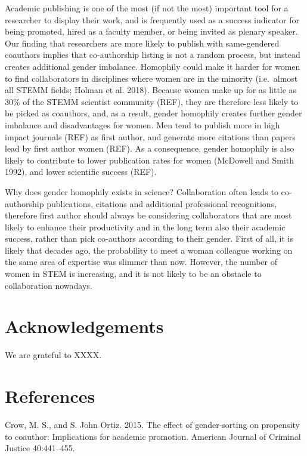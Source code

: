 \documentclass[12pt,]{article}
\begin{document}
Academic publishing is one of the most (if not the most) important tool
for a researcher to display their work, and is frequently used as a
success indicator for being promoted, hired as a faculty member, or
being invited as plenary speaker. Our finding that researchers are more
likely to publish with same-gendered coauthors implies that
co-authorship listing is not a random process, but instead creates
additional gender imbalance. Homophily could make it harder for women to
find collaborators in disciplines where women are in the minority
(i.e.~almost all STEMM fields; Holman et al. 2018). Because women make
up for as little as 30\% of the STEMM scientist community (REF), they
are therefore less likely to be picked as coauthors, and, as a result,
gender homophily creates further gender imbalance and disadvantages for
women. Men tend to publish more in high impact journals (REF) as first
author, and generate more citations than papers lead by first author
women (REF). As a consequence, gender homophily is also likely to
contribute to lower publication rates for women (McDowell and Smith
1992), and lower scientific success (REF).

Why does gender homophily exists in science? Collaboration often leads
to co-authorship publications, citations and additional professional
recognitions, therefore first author should always be considering
collaborators that are most likely to enhance their productivity and in
the long term also their academic success, rather than pick co-authors
according to their gender. First of all, it is likely that decades ago,
the probability to meet a woman colleague working on the same area of
expertise was slimmer than now. However, the number of women in STEM is
increasing, and it is not likely to be an obstacle to collaboration
nowadays.

\section{Acknowledgements}\label{acknowledgements}

We are grateful to XXXX.

\section{References}\label{references}

\hypertarget{refs}{}
\hypertarget{ref-Crow_2015}{}
Crow, M. S., and S. John Ortiz. 2015. The effect of gender‐sorting on
propensity to coauthor: Implications for academic promotion. American
Journal of Criminal Justice 40:441--455.
\end{document}
